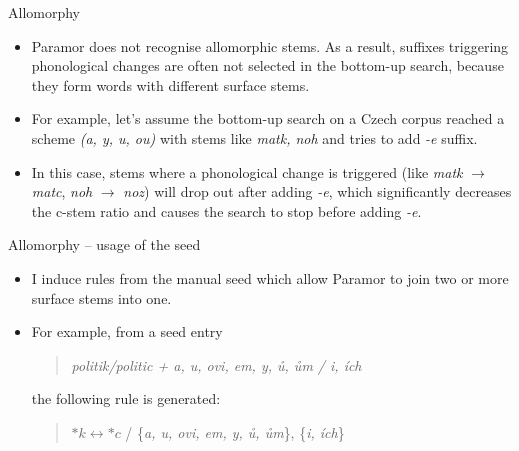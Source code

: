\documentclass[hyperref={pdfencoding=unicode, unicode=true}, xcolor=dvipsnames]{beamer}
\begin{document}
\begin{frame}{Allomorphy}
\begin{itemize}
\item Paramor does not recognise allomorphic stems. As a result, suffixes triggering phonological changes are often not selected in the bottom-up search, because they form words with different surface stems. 
\item For example, let's assume the bottom-up search on a Czech corpus reached a scheme \emph{(a, y, u, ou)} with stems like \emph{matk, noh} and tries to add \emph{-e} suffix.
\item In this case, stems where a phonological change is triggered (like \emph{matk} $ \rightarrow $ \emph{matc}, \emph{noh} $ \rightarrow $ \emph{noz}) will drop out after adding \emph{-e}, which significantly decreases the c-stem ratio and causes the search to stop before adding \emph{-e}.
\end{itemize}

\end{frame}

\begin{frame}{Allomorphy -- usage of the seed}
\begin{itemize}
\item I induce rules from the manual seed which allow Paramor to join two or more surface stems into one.
\item For example, from a seed entry 
\begin{quote}
\emph{politik/politic + a, u, ovi, em, y, ů, ům / i, ích}
\end{quote}
the following rule is generated:
\begin{quote}
$*k \leftrightarrow *c$ / \{\emph{a, u, ovi, em, y, ů, ům}\}, \{\emph{i, ích}\}
\end{quote}
\end{itemize}

\end{frame}

%
\end{document}
